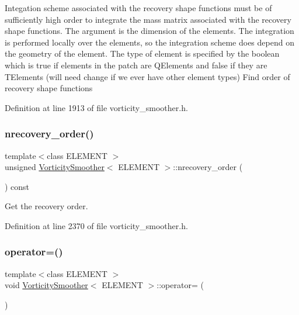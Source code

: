 Integation scheme associated with the recovery shape functions must be of sufficiently high order to integrate the mass matrix associated with the recovery shape functions. The argument is the dimension of the elements. The integration is performed locally over the elements, so the integration scheme does depend on the geometry of the element. The type of element is specified by the boolean which is true if elements in the patch are Q\+Elements and false if they are T\+Elements (will need change if we ever have other element types) Find order of recovery shape functions 

Definition at line 1913 of file vorticity\+\_\+smoother.\+h.

\mbox{\label{classVorticitySmoother_afd541244932a3f42dd4c59c2a8430058}} 
\subsubsection{\texorpdfstring{nrecovery\+\_\+order()}{nrecovery\_order()}}
{\footnotesize\ttfamily template$<$class E\+L\+E\+M\+E\+NT $>$ \\
unsigned \hyperlink{classVorticitySmoother}{Vorticity\+Smoother}$<$ E\+L\+E\+M\+E\+NT $>$\+::nrecovery\+\_\+order (\begin{DoxyParamCaption}{ }\end{DoxyParamCaption}) const\hspace{0.3cm}{\ttfamily [inline]}}



Get the recovery order. 



Definition at line 2370 of file vorticity\+\_\+smoother.\+h.

\mbox{\label{classVorticitySmoother_aeaf3571e328e4b43a9e30de6165b9ea9}} 
\subsubsection{\texorpdfstring{operator=()}{operator=()}}
{\footnotesize\ttfamily template$<$class E\+L\+E\+M\+E\+NT $>$ \\
void \hyperlink{classVorticitySmoother}{Vorticity\+Smoother}$<$ E\+L\+E\+M\+E\+NT $>$\+::operator= (\begin{DoxyParamCaption}\item[{const \hyperlink{classVorticitySmoother}{Vorticity\+Smoother}$<$ E\+L\+E\+M\+E\+NT $>$ \&}]{ }\end{DoxyParamCaption})\hspace{0.3cm}{\ttfamily [inline]}}



